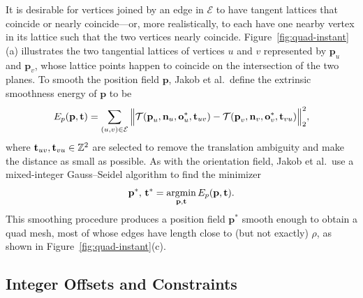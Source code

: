 It is desirable for vertices joined by an edge in $\mathcal{E}$ to have tangent lattices that coincide or nearly coincide---or, more realistically, to each have one nearby vertex in its lattice such that the two vertices nearly coincide. Figure~\ref{fig:quad-instant}(a) illustrates the two tangential lattices of vertices $u$ and $v$ represented by $\mathbf{p}_u$ and $\mathbf{p}_v$, whose lattice points happen to coincide on the intersection of the two planes. To smooth the position field $\mathbf{p}$, Jakob et al.\ define the extrinsic smoothness energy  of $\mathbf{p}$ to be
\begin{equation*}
E_p(\mathbf{p},\textbf{t})=\sum_{(u,v) \in \mathcal{E}} \Big\Vert\mathcal{T}(\textbf{p}_u, \textbf{n}_u, \mathbf{o}^*_u, \textbf{t}_{uv}) - \mathcal{T}(\textbf{p}_v, \textbf{n}_v, \mathbf{o}^*_v, \textbf{t}_{vu}) \Big\Vert_2^2,
\end{equation*}
where $\mathbf{t}_{uv}, \mathbf{t}_{vu} \in \mathbb{Z}^2$ are selected to remove the translation ambiguity and make the distance as small as possible. As with the orientation field, Jakob et al.\ use a mixed-integer Gauss--Seidel algorithm to find the minimizer
\begin{equation}
\mathbf{p}^*,\, \mathbf{t}^* = \operatorname*{argmin}_{\mathbf{p}, \mathbf{t}} E_p(\mathbf{p}, \mathbf{t}). \label{eq:quad-im2}
\end{equation}
This smoothing procedure produces a position field $\mathbf{p}^*$ smooth enough to obtain a quad mesh, most of whose edges have length close to (but not exactly) $\rho$, as shown in Figure~\ref{fig:quad-instant}(c).

\subsection{Integer Offsets and Constraints}
\label{sec:intdef}


